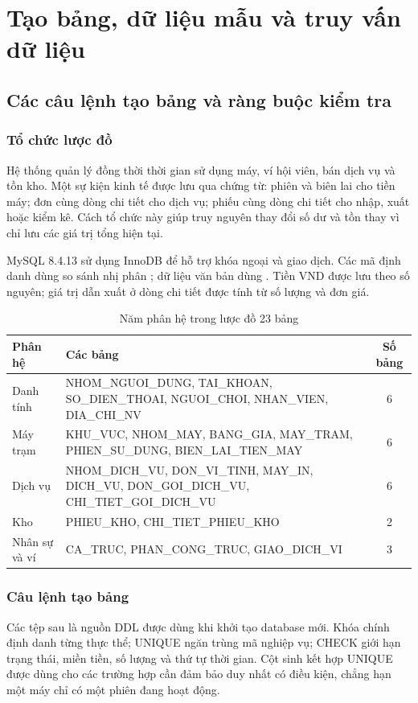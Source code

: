 \chapter{Tạo bảng, dữ liệu mẫu và truy vấn dữ liệu}\label{chap:schema}
\section{Các câu lệnh tạo bảng và ràng buộc kiểm tra}\label{sec:schema}
\subsection{Tổ chức lược đồ}
Hệ thống quản lý đồng thời thời gian sử dụng máy, ví hội viên, bán dịch vụ và tồn kho. Một sự kiện kinh tế được lưu qua chứng từ: phiên và biên lai cho tiền máy; đơn cùng dòng chi tiết cho dịch vụ; phiếu cùng dòng chi tiết cho nhập, xuất hoặc kiểm kê. Cách tổ chức này giúp truy nguyên thay đổi số dư và tồn thay vì chỉ lưu các giá trị tổng hiện tại.

MySQL 8.4.13 sử dụng InnoDB để hỗ trợ khóa ngoại và giao dịch. Các mã định danh dùng so sánh nhị phân ; dữ liệu văn bản dùng . Tiền VND được lưu theo số nguyên; giá trị dẫn xuất ở dòng chi tiết được tính từ số lượng và đơn giá.
\begin{table}[H]\centering\small\caption{Năm phân hệ trong lược đồ 23 bảng}
\begin{tabularx}{\linewidth}{@{}p{34mm}Yc@{}}\toprule
\textbf{Phân hệ}&\textbf{Các bảng}&\textbf{Số bảng}\\\midrule
Danh tính & NHOM\_NGUOI\_DUNG, TAI\_KHOAN, SO\_DIEN\_THOAI, NGUOI\_CHOI, NHAN\_VIEN, DIA\_CHI\_NV & 6\\
Máy trạm & KHU\_VUC, NHOM\_MAY, BANG\_GIA, MAY\_TRAM, PHIEN\_SU\_DUNG, BIEN\_LAI\_TIEN\_MAY & 6\\
Dịch vụ & NHOM\_DICH\_VU, DON\_VI\_TINH, MAY\_IN, DICH\_VU, DON\_GOI\_DICH\_VU, CHI\_TIET\_GOI\_DICH\_VU & 6\\
Kho & PHIEU\_KHO, CHI\_TIET\_PHIEU\_KHO & 2\\
Nhân sự và ví & CA\_TRUC, PHAN\_CONG\_TRUC, GIAO\_DICH\_VI & 3\\\bottomrule
\end{tabularx}\end{table}
\subsection{Câu lệnh tạo bảng}
Các tệp sau là nguồn DDL được dùng khi khởi tạo database mới. Khóa chính định danh từng thực thể; UNIQUE ngăn trùng mã nghiệp vụ; CHECK giới hạn trạng thái, miền tiền, số lượng và thứ tự thời gian. Cột sinh kết hợp UNIQUE được dùng cho các trường hợp cần đảm bảo duy nhất có điều kiện, chẳng hạn một máy chỉ có một phiên đang hoạt động.

